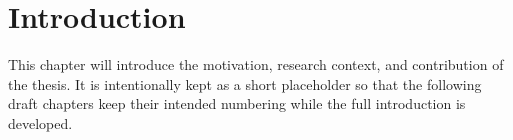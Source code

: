 \chapter{Introduction}
\label{chap:introduction}

This chapter will introduce the motivation, research context, and contribution
of the thesis. It is intentionally kept as a short placeholder so that the
following draft chapters keep their intended numbering while the full
introduction is developed.
